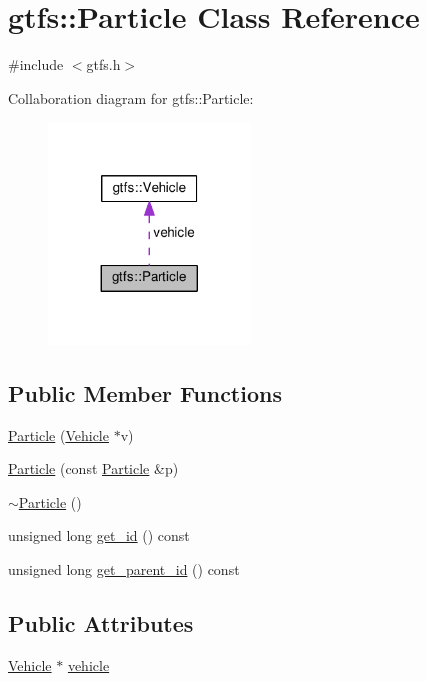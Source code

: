 \hypertarget{classgtfs_1_1Particle}{}\section{gtfs\+:\+:Particle Class Reference}
\label{classgtfs_1_1Particle}


{\ttfamily \#include $<$gtfs.\+h$>$}



Collaboration diagram for gtfs\+:\+:Particle\+:\nopagebreak
\begin{figure}[H]
\begin{center}
\leavevmode
\includegraphics[width=152pt]{classgtfs_1_1Particle__coll__graph}
\end{center}
\end{figure}
\subsection*{Public Member Functions}
\begin{DoxyCompactItemize}
\item 
\hyperlink{classgtfs_1_1Particle_ad7f42e77c6c7f3042c977fd5a42ff82f}{Particle} (\hyperlink{classgtfs_1_1Vehicle}{Vehicle} $\ast$v)
\item 
\hyperlink{classgtfs_1_1Particle_ac386e64b43b1e317063f9a6666d604ce}{Particle} (const \hyperlink{classgtfs_1_1Particle}{Particle} \&p)
\item 
\hyperlink{classgtfs_1_1Particle_a3accf3496ad8460b4ad8b3f6da2de411}{$\sim$\+Particle} ()
\item 
unsigned long \hyperlink{classgtfs_1_1Particle_aff52b6b5e4c8f845f8ab3eefe766c365}{get\+\_\+id} () const 
\item 
unsigned long \hyperlink{classgtfs_1_1Particle_a4f103db764459e99f6427f8a4ca50b1f}{get\+\_\+parent\+\_\+id} () const 
\end{DoxyCompactItemize}
\subsection*{Public Attributes}
\begin{DoxyCompactItemize}
\item 
\hyperlink{classgtfs_1_1Vehicle}{Vehicle} $\ast$ \hyperlink{classgtfs_1_1Particle_a81c313d505ecb592d79463f167dfb76c}{vehicle}
\end{DoxyCompactItemize}


